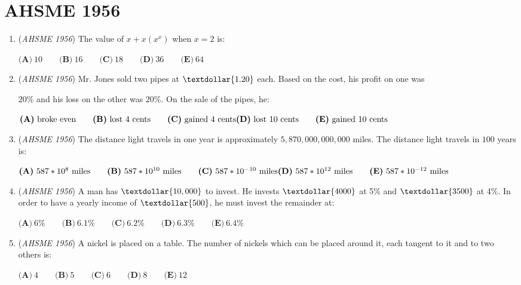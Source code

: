 \section{AHSME 1956}
        \begin{enumerate}
        	\item (\textit{AHSME 1956}) The value of $x + x(x^x)$ when $x = 2$ is: 


 $\textbf{(A)}\ 10 \qquad\textbf{(B)}\ 16 \qquad\textbf{(C)}\ 18 \qquad\textbf{(D)}\ 36 \qquad\textbf{(E)}\ 64$


	\item (\textit{AHSME 1956}) Mr. Jones sold two pipes at $\textdollar{ 1.20}$ each. Based on the cost, his profit on one was


 $20$\% and his loss on the other was $20$\%. 
On the sale of the pipes, he: 


 $\textbf{(A)}\ \text{broke even}\qquad \textbf{(B)}\ \text{lost }4\text{ cents} \qquad\textbf{(C)}\ \text{gained }4\text{ cents}\qquad \\ \textbf{(D)}\ \text{lost }10\text{ cents}\qquad \textbf{(E)}\ \text{gained }10\text{ cents}$


	\item (\textit{AHSME 1956}) The distance light travels in one year is approximately $5,870,000,000,000$ miles. The distance light travels in $100$ years is: 


 $\textbf{(A)}\ 587 * 10^8\text{ miles}\qquad \textbf{(B)}\ 587 * 10^{10}\text{ miles}\qquad \textbf{(C)}\ 587*10^{-10}\text{ miles} \\ \textbf{(D)}\ 587 * 10^{12} \text{ miles} \qquad \textbf{(E)}\ 587* 10^{ - 12} \text{ miles}$


	\item (\textit{AHSME 1956}) A man has $\textdollar{10,000 }$ to invest. He invests $\textdollar{4000}$ at 5\% and $\textdollar{3500}$ at 4\%. 
In order to have a yearly income of $\textdollar{500}$, he must invest the remainder at: 


 $\textbf{(A)}\ 6\%\qquad\textbf{(B)}\ 6.1\%\qquad\textbf{(C)}\ 6.2\%\qquad\textbf{(D)}\ 6.3\%\qquad\textbf{(E)}\ 6.4\%$


	\item (\textit{AHSME 1956}) A nickel is placed on a table. The number of nickels which can be placed around it, each tangent to it and to two others is: 


 $\textbf{(A)}\ 4 \qquad\textbf{(B)}\ 5 \qquad\textbf{(C)}\ 6 \qquad\textbf{(D)}\ 8 \qquad\textbf{(E)}\ 12$



\end{enumerate}
